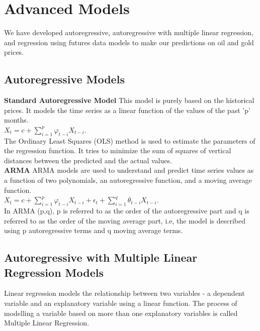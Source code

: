 \documentclass[runningheads]{llncs}
\begin{document}
\section{Advanced Models}
We have developed autoregressive, autoregressive with multiple linear regression, and regression using futures data models to make our predictions on oil and gold prices. \\

\subsection{Autoregressive Models}
\noindent\textbf{Standard Autoregressive Model} This model is purely based on the historical prices. It models the time series as a linear function of the values of the past 'p' months.\\

$ X_{t} = c + \sum\limits_{i=1}^p \varphi_{t-i}X_{t-i}$. \\

\noindent The Ordinary Least Squares (OLS) method is used to estimate the parameters of the regression function. It tries to minimize the sum of squares of vertical distances between the predicted and the actual values. \\

\noindent\textbf{ARMA} ARMA models are used to understand and predict time series values as a function of two polynomials, an autoregressive function, and a moving average function. 
\\

$ X_{t} = c + \sum\limits_{i=1}^p \varphi_{t-i}X_{t-i} + \epsilon_{t} + \sum\limits_{i=1}^q \theta_{t-i}X_{t-i}$.\\

\noindent In ARMA (p,q), p is referred to as the order of the autoregressive part and q is referred to as the order of the moving average part, i.e, the model is described using p autoregressive terms and q moving average terms.\\ 

\subsection{Autoregressive with Multiple Linear Regression Models}
Linear regression models the relationship between two variables - a dependent variable and an explanatory variable using a linear function. The process of modelling a variable based on more than one explanatory variables is called Multiple Linear Regression. \\
   
\end{document}

